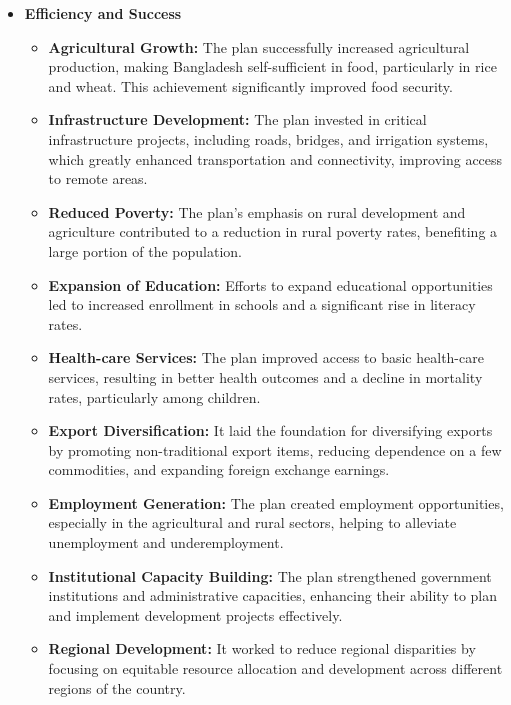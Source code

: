 \begin{itemize}
	\item\textbf{Efficiency and Success}
	\begin{itemize}
		\item\textbf{Agricultural Growth: } The plan successfully increased agricultural production, 
		making Bangladesh self-sufficient in food, particularly in rice and wheat. This achievement 
		significantly improved food security.
		\item\textbf{Infrastructure Development: } The plan invested in critical infrastructure projects, 
		including roads, bridges, and irrigation systems, which greatly enhanced transportation and connectivity, 
		improving access to remote areas.
		\item\textbf{Reduced Poverty: } The plan's emphasis on rural development and agriculture 
		contributed to a reduction in rural poverty rates, benefiting a large portion of the population.
		\item\textbf{Expansion of Education: } Efforts to expand educational opportunities led to 
		increased enrollment in schools and a significant rise in literacy rates.
		\item\textbf{Health-care Services: } The plan improved access to basic health-care services, 
		resulting in better health outcomes and a decline in mortality rates, particularly among children.
		\item\textbf{Export Diversification: } It laid the foundation for diversifying exports by promoting 
		non-traditional export items, reducing dependence on a few commodities, and expanding foreign exchange earnings.
		\item\textbf{Employment Generation: } The plan created employment opportunities, especially in the 
		agricultural and rural sectors, helping to alleviate unemployment and underemployment.
		\item\textbf{Institutional Capacity Building: } The plan strengthened government institutions and 
		administrative capacities, enhancing their ability to plan and implement development projects effectively.
		\item\textbf{Regional Development: } It worked to reduce regional disparities 
		by focusing on equitable resource allocation and development across different regions of the country.
	\end{itemize}
	

\end{itemize}
